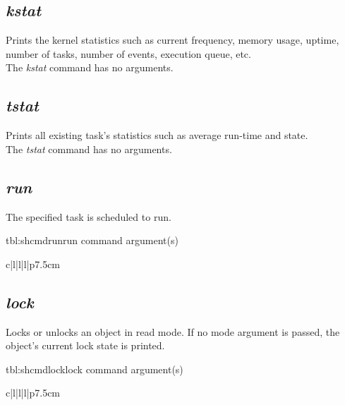 \subsection{\textit{kstat}}
Prints the kernel statistics such as current frequency, memory usage, uptime, number of tasks, 
number of events, execution queue, etc.\\
The \textit{kstat} command has no arguments.


\subsection{\textit{tstat}}
Prints all existing task's statistics such as average run-time and state.\\
The \textit{tstat} command has no arguments.

\subsection{\textit{run}}
The specified task is scheduled to run.

\begin{pdtable}{tbl:shcmdrun}{run command argument(s)}
	\begin{pdtabular}{c|l|l|l|p{7.5cm}}
	\end{pdtabular}
\end{pdtable}

\subsection{\textit{lock}}
Locks or unlocks an object in read mode.
If no mode argument is passed, the object's current lock state is printed.

\begin{pdtable}{tbl:shcmdlock}{lock command argument(s)}
	\begin{pdtabular}{c|l|l|l|p{7.5cm}}
	\end{pdtabular}
\end{pdtable}

